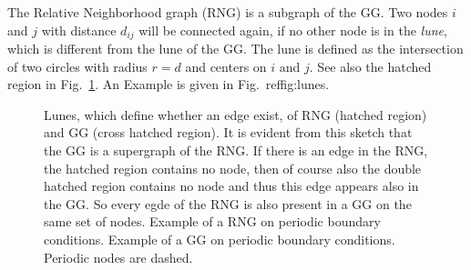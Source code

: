         The Relative Neighborhood
        graph (RNG) \cite{Toussaint1980} is a subgraph of the GG. Two nodes \(i\) and \(j\) with
        distance \(d_{ij}\) will be connected again, if no other node is in the
        \emph{lune}, which is different from the lune of the GG. The lune
        is defined as the intersection of two
        circles with radius \(r = d\) and centers on \(i\) and \(j\).
        See also the hatched region in Fig.\ \ref{fig:lunes}. An Example is
        given in Fig.\ ref{fig:lunes}.

    \begin{figure}[htbp]
        \centering
        \caption[Gabriel - and Relative Neighborhood Graph]
        {
             Lunes, which define whether an edge
                exist, of RNG (hatched region) and GG (cross hatched region).
                It is evident from this sketch that the GG is a supergraph
                of the RNG. If there is an edge in the RNG, the hatched
                region contains no node, then of course also the double
                hatched region contains no node and thus this edge appears
                also in the GG. So every egde of the RNG is also present
                in a GG on the same set of nodes.
             Example of a RNG on periodic
                boundary conditions.
             Example of a GG on
                periodic boundary conditions. Periodic nodes are dashed.
        }
        \label{fig:lunes}
    \end{figure}

